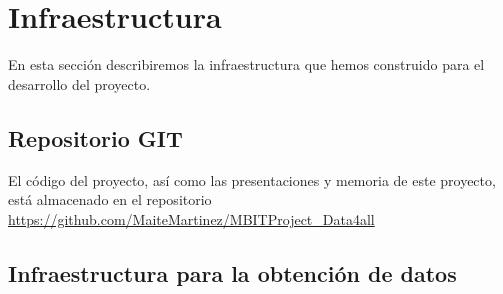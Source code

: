 
\chapter{Infraestructura}
En esta sección describiremos la infraestructura que hemos construido para el desarrollo del proyecto.
\section{Repositorio GIT}
El código del proyecto, así como las presentaciones y memoria de este proyecto, está almacenado en el 
repositorio \url{https://github.com/MaiteMartinez/MBITProject_Data4all}


\section{Infraestructura para la obtención de datos}

